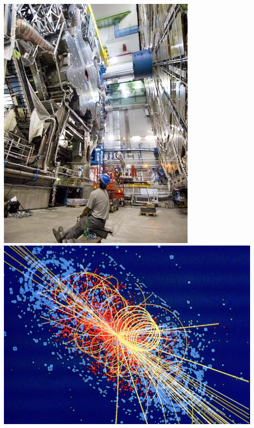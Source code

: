 \documentclass{beamer}
\begin{document}
\begin{frame}
\begin{columns}
\begin{column}{0.4\textwidth}
            \includegraphics[width=\textwidth]{figures/lhc3.jpg}\\
            \includegraphics[width=\textwidth]{figures/lhc4.jpg}
        \end{column}
    \end{columns}
\end{frame}
\end{document}
